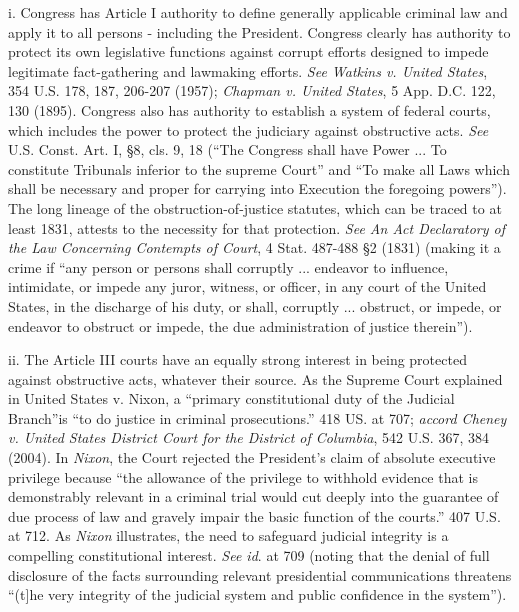 i. Congress has Article I authority to define generally applicable criminal law and apply it to all persons - including the President.
Congress clearly has authority to protect its own legislative functions against corrupt efforts designed to impede legitimate fact-gathering and lawmaking efforts.
\textit{See Watkins v. United States}, 354 U.S. 178, 187, 206-207 (1957);
\textit{Chapman v. United States}, 5 App. D.C. 122, 130 (1895).
Congress also has authority to establish a system of federal courts, which includes the power to protect the judiciary against obstructive acts.
\textit{See} U.S. Const. Art. I, \S 8, cls. 9, 18 (“The Congress shall have Power ... To constitute Tribunals inferior to the supreme Court” and “To make all Laws which shall be necessary and proper for carrying into Execution the foregoing powers”).
The long lineage of the obstruction-of-justice statutes, which can be traced to at least 1831, attests to the necessity for that protection.
\textit{See An Act Declaratory of the Law Concerning Contempts of Court}, 4 Stat. 487-488 \S 2 (1831) (making it a crime if “any person or persons shall corruptly ... endeavor to influence, intimidate, or impede any juror, witness, or officer, in any court of the United States, in the discharge of his duty, or shall, corruptly ... obstruct, or impede, or endeavor to obstruct or impede, the due administration of justice therein”).

ii. The Article III courts have an equally strong interest in being protected against obstructive acts, whatever their source.
As the Supreme Court explained in United States v. Nixon, a “primary constitutional duty of the Judicial Branch”is “to do justice in criminal prosecutions.” 418 US. at 707;
\textit{accord Cheney v. United States District Court for the District of Columbia}, 542 U.S. 367, 384 (2004).
In \textit{Nixon}, the Court rejected the President’s claim of absolute executive privilege because “the allowance of the privilege to withhold evidence that is demonstrably relevant in a criminal trial would cut deeply into the guarantee of due process of law and gravely impair the basic function of the courts.” 407 U.S. at 712.
As \textit{Nixon} illustrates, the need to safeguard judicial integrity is a compelling constitutional interest.
\textit{See id}. at 709 (noting that the denial of full disclosure of the facts surrounding relevant presidential communications threatens “(t]he very integrity of the judicial system and public confidence in the system”).

